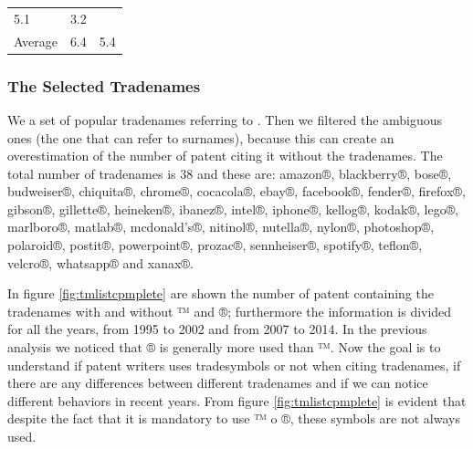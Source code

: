 \documentclass[b5paper,]{book}
\theoremstyle{definition}
\theoremstyle{definition}
\theoremstyle{definition}
\theoremstyle{remark}
\begin{document}
\begin{longtable}[]{@{}lll@{}}
\begin{minipage}[t]{0.39\columnwidth}
5.1\strut
\end{minipage} & \begin{minipage}[t]{0.39\columnwidth}\raggedright\strut
3.2\strut
\end{minipage}\tabularnewline
\begin{minipage}[t]{0.13\columnwidth}\raggedright\strut
Average\strut
\end{minipage} & \begin{minipage}[t]{0.39\columnwidth}\raggedright\strut
6.4\strut
\end{minipage} & \begin{minipage}[t]{0.39\columnwidth}\raggedright\strut
5.4\strut
\end{minipage}\tabularnewline
\bottomrule
\end{longtable}

\subsubsection*{The Selected Tradenames}\label{the-selected-tradenames}

We a set of popular tradenames referring to
\citep{morris2016trademarks}. Then we filtered the ambiguous ones (the
one that can refer to surnames), because this can create an
overestimation of the number of patent citing it without the tradenames.
The total number of tradenames is 38 and these are: amazon®,
blackberry®, bose®, budweiser®, chiquita®, chrome®, cocacola®, ebay®,
facebook®, fender®, firefox®, gibson®, gillette®, heineken®, ibanez®,
intel®, iphone®, kellog®, kodak®, lego®, marlboro®, matlab®,
mcdonald's®, nitinol®, nutella®, nylon®, photoshop®, polaroid®, postit®,
powerpoint®, prozac®, sennheiser®, spotify®, teflon®, velcro®, whatsapp®
and xanax®.

In figure \ref{fig:tmlistcpmplete} are shown the number of patent
containing the tradenames with and without ™ and ®; furthermore the
information is divided for all the years, from 1995 to 2002 and from
2007 to 2014. In the previous analysis we noticed that ® is generally
more used than ™. Now the goal is to understand if patent writers uses
tradesymbols or not when citing tradenames, if there are any differences
between different tradenames and if we can notice different behaviors in
recent years. From figure \ref{fig:tmlistcpmplete} is evident that
despite the fact that it is mandatory to use ™ o ®, these symbols are
not always used.
\end{document}
